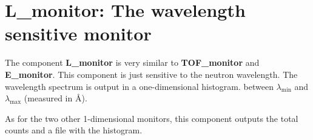 

\section{L\_monitor: The wavelength sensitive monitor}
\label{s:L_monitor}


The component \textbf{L\_monitor} is very similar to
\textbf{TOF\_monitor} and \textbf{E\_monitor}.
This component is just sensitive to the neutron wavelength.
The wavelength spectrum is output in a one-dimensional histogram.
between $\lambda_\textrm{min}$ and $\lambda_\textrm{max}$ (measured in \AA ).

As for the two other 1-dimensional monitors, this component outputs
the total counts and a file with the histogram.

